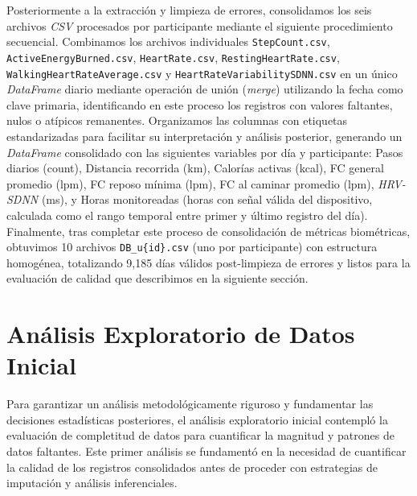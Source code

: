Posteriormente a la extracción y limpieza de errores, consolidamos los seis archivos \textit{CSV} procesados por participante mediante el siguiente procedimiento secuencial. Combinamos los archivos individuales {\small\texttt{StepCount.csv}}, {\small\texttt{ActiveEnergyBurned.csv}}, {\small\texttt{HeartRate.csv}}, {\small\texttt{RestingHeartRate.csv}}, {\small\texttt{WalkingHeartRateAverage.csv}} y {\small\texttt{HeartRateVariabilitySDNN.csv}} en un único \textit{DataFrame} diario mediante operación de unión (\textit{merge}) utilizando la fecha como clave primaria, identificando en este proceso los registros con valores faltantes, nulos o atípicos remanentes. Organizamos las columnas con etiquetas estandarizadas para facilitar su interpretación y análisis posterior, generando un \textit{DataFrame} consolidado con las siguientes variables por día y participante: Pasos diarios (count), Distancia recorrida (km), Calorías activas (kcal), FC general promedio (lpm), FC reposo mínima (lpm), FC al caminar promedio (lpm), \textit{HRV-SDNN} (ms), y Horas monitoreadas (horas con señal válida del dispositivo, calculada como el rango temporal entre primer y último registro del día). Finalmente, tras completar este proceso de consolidación de métricas biométricas, obtuvimos 10 archivos {\small\texttt{DB\_u\{id\}.csv}} (uno por participante) con estructura homogénea, totalizando 9,185 días válidos post-limpieza de errores y listos para la evaluación de calidad que describimos en la siguiente sección.


\section{Análisis Exploratorio de Datos Inicial}
\label{sec:eda_inicial}

Para garantizar un análisis metodológicamente riguroso y fundamentar las decisiones estadísticas posteriores, el análisis exploratorio inicial contempló la evaluación de completitud de datos para cuantificar la magnitud y patrones de datos faltantes. Este primer análisis se fundamentó en la necesidad de cuantificar la calidad de los registros consolidados antes de proceder con estrategias de imputación y análisis inferenciales.

